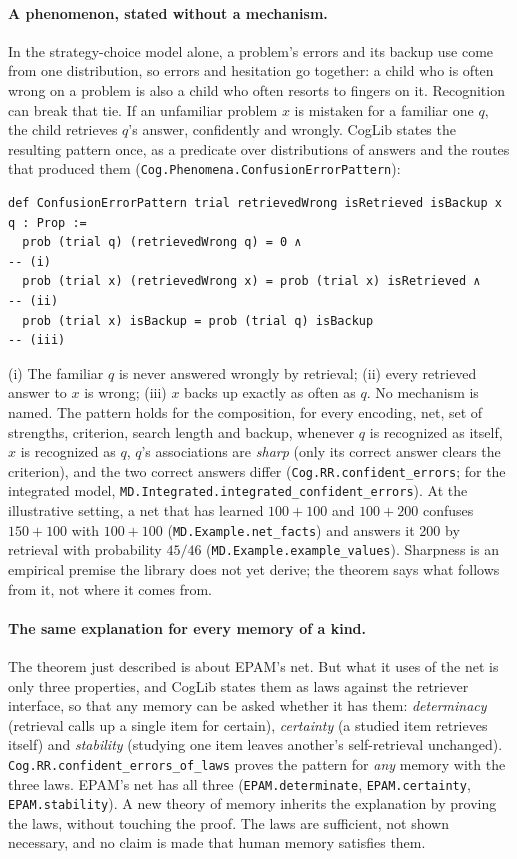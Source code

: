 \documentclass[11pt]{article}
\newcommand{\lean}[1]{\texttt{#1}}
\begin{document}
\paragraph{A phenomenon, stated without a mechanism.} In the
strategy-choice model alone, a problem's errors and its backup use come
from one distribution, so errors and hesitation go together: a child
who is often wrong on a problem is also a child who often resorts to
fingers on it. Recognition can break that tie. If an unfamiliar
problem $x$ is mistaken for a familiar one $q$, the child retrieves
$q$'s answer, confidently and wrongly. CogLib states the resulting
pattern once, as a predicate over distributions of answers and the
routes that produced them
(\lean{Cog.Phenomena.ConfusionErrorPattern}):
\begin{Verbatim}[fontsize=\small]
def ConfusionErrorPattern trial retrievedWrong isRetrieved isBackup x q : Prop :=
  prob (trial q) (retrievedWrong q) = 0 ∧                             -- (i)
  prob (trial x) (retrievedWrong x) = prob (trial x) isRetrieved ∧    -- (ii)
  prob (trial x) isBackup = prob (trial q) isBackup                   -- (iii)
\end{Verbatim}
(i) The familiar $q$ is never answered wrongly by retrieval; (ii)
every retrieved answer to $x$ is wrong; (iii) $x$ backs up exactly as
often as $q$. No mechanism is named. The pattern holds for the
composition, for every encoding, net, set of strengths, criterion,
search length and backup, whenever $q$ is recognized as itself, $x$ is
recognized as $q$, $q$'s associations are \emph{sharp} (only its
correct answer clears the criterion), and the two correct answers
differ (\lean{Cog.RR.confident\_errors}; for the integrated model,
\lean{MD.Integrated.integrated\_confident\_errors}). At the
illustrative setting, a net that has learned $100+100$ and $100+200$
confuses $150+100$ with $100+100$ (\lean{MD.Example.net\_facts}) and
answers it 200 by retrieval with probability $45/46$
(\lean{MD.Example.example\_values}). Sharpness is an empirical
premise the library does not yet derive; the theorem says what follows
from it, not where it comes from.

\paragraph{The same explanation for every memory of a kind.} The theorem
just described is about EPAM's net. But what it uses of the net is
only three properties, and CogLib states them as laws against the
retriever interface, so that any memory can be asked whether it has
them: \emph{determinacy} (retrieval calls up a single item for
certain), \emph{certainty} (a studied item retrieves itself) and
\emph{stability} (studying one item leaves another's self-retrieval
unchanged). \lean{Cog.RR.confident\_errors\_of\_laws} proves the pattern
for \emph{any} memory with the three laws. EPAM's net has all three
(\lean{EPAM.determinate}, \lean{EPAM.certainty},
\lean{EPAM.stability}). A new theory of memory inherits the
explanation by proving the laws, without touching the proof. The laws
are sufficient, not shown necessary, and no claim is made that human
memory satisfies them.
\end{document}
